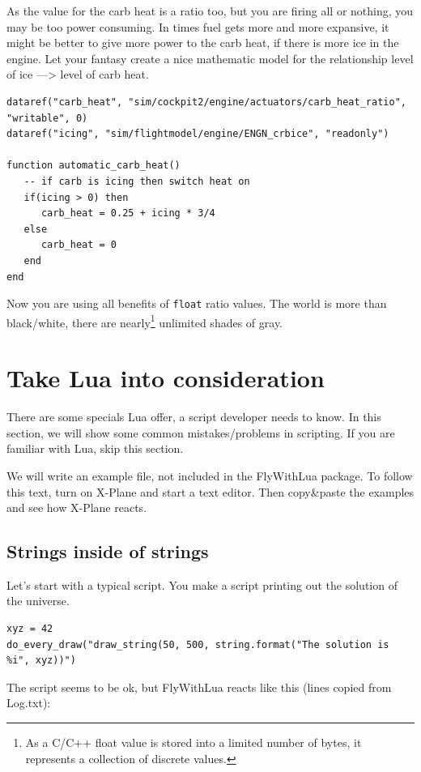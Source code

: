 \documentclass[11pt,parskip=half,a4paper]{scrartcl}
\begin{document}
As the value for the carb heat is a ratio too, but you are firing all or nothing, you may be too power consuming. In times fuel gets more and more expansive, it might be better to give more power to the carb heat, if there is more ice in the engine. Let your fantasy create a nice mathematic model for the relationship level of ice ---> level of carb heat.

\begin{lstlisting}
dataref("carb_heat", "sim/cockpit2/engine/actuators/carb_heat_ratio", "writable", 0)
dataref("icing", "sim/flightmodel/engine/ENGN_crbice", "readonly")

function automatic_carb_heat()
   -- if carb is icing then switch heat on 
   if(icing > 0) then
      carb_heat = 0.25 + icing * 3/4
   else
      carb_heat = 0
   end
end
\end{lstlisting}

Now you are using all benefits of \verb|float| ratio values. The world is more than black/white, there are nearly\footnote{As a C/C++ float value is stored into a limited number of bytes, it represents a collection of discrete values.} unlimited shades of gray.

\newpage
\section{Take Lua into consideration}

There are some specials Lua offer, a script developer needs to know. In this section, we will show some common mistakes/problems in scripting. If you are familiar with Lua, skip this section.

We will write an example file, not included in the FlyWithLua package. To follow this text, turn on X-Plane and start a text editor. Then copy\&paste the examples and see how X-Plane reacts.

\subsection{Strings inside of strings}

Let's start with a typical script. You make a script printing out the solution of the universe.

\begin{lstlisting}
xyz = 42
do_every_draw("draw_string(50, 500, string.format("The solution is %i", xyz))")
\end{lstlisting}

The script seems to be ok, but FlyWithLua reacts like this (lines copied from Log.txt):
\end{document}
